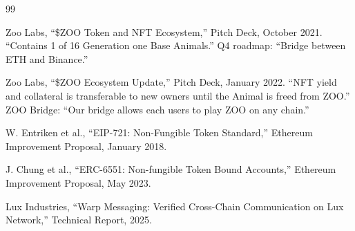 \documentclass[11pt,letterpaper]{article}
\begin{document}

\begin{thebibliography}{99}

Zoo Labs, ``\$ZOO Token and NFT Ecosystem,'' Pitch Deck, October 2021. ``Contains 1 of 16 Generation one Base Animals.'' Q4 roadmap: ``Bridge between ETH and Binance.''

Zoo Labs, ``\$ZOO Ecosystem Update,'' Pitch Deck, January 2022. ``NFT yield and collateral is transferable to new owners until the Animal is freed from ZOO.'' ZOO Bridge: ``Our bridge allows each users to play ZOO on any chain.''

W. Entriken et al., ``EIP-721: Non-Fungible Token Standard,'' Ethereum Improvement Proposal, January 2018.

J. Chung et al., ``ERC-6551: Non-fungible Token Bound Accounts,'' Ethereum Improvement Proposal, May 2023.

Lux Industries, ``Warp Messaging: Verified Cross-Chain Communication on Lux Network,'' Technical Report, 2025.

\end{thebibliography}
\end{document}
